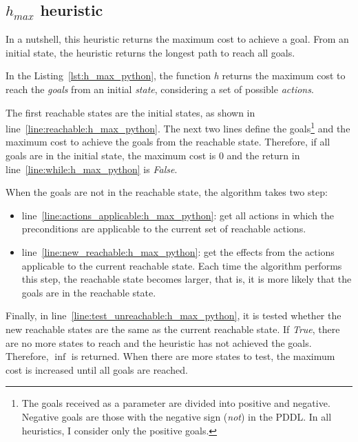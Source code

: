 \documentclass[letterpaper]{article}
\begin{document}
\subsection{$h_{max}$ heuristic}
In a nutshell, this heuristic returns the maximum cost to achieve a goal. From an initial state, the heuristic returns the longest path to reach all goals.



In the Listing~\ref{lst:h_max_python}, the function \textit{h} returns the maximum cost to reach the \textit{goals} from an initial \textit{state}, considering a set of possible \textit{actions}.

The first reachable states are the initial states, as shown in line~\ref{line:reachable:h_max_python}. The next two lines define the goals\footnote{The goals received as a parameter are divided into positive and negative. Negative goals are those with the negative sign (\textit{not}) in the PDDL. In all heuristics, I consider only the positive goals.} and the maximum cost to achieve the goals from the reachable state. Therefore, if all goals are in the initial state, the maximum cost is $0$ and the return in line~\ref{line:while:h_max_python} is \textit{False}.

When the goals are not in the reachable state, the algorithm takes two step:

\begin{itemize}
  \item line~\ref{line:actions_applicable:h_max_python}: get all actions in which the preconditions are applicable to the current set of reachable actions.
  \item line~\ref{line:new_reachable:h_max_python}: get the effects from the actions applicable to the current reachable state. Each time the algorithm performs this step, the reachable state becomes larger, that is, it is more likely that the goals are in the reachable state.
\end{itemize}

Finally, in line~\ref{line:test_unreachable:h_max_python}, it is tested whether the new reachable states are the same as the current reachable state. If \textit{True}, there are no more states to reach and the heuristic has not achieved the goals. Therefore, $\inf$ is returned. When there are more states to test, the maximum cost is increased until all goals are reached.
\end{document}

